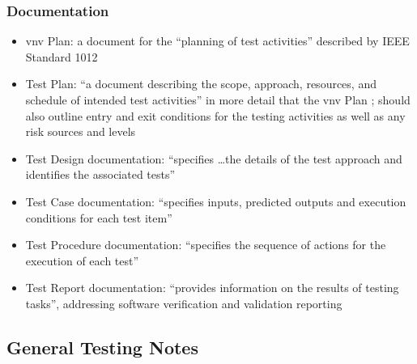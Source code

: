 \subsubsection{Documentation}

\begin{itemize}
      \item \acf{vnv} Plan: a document for the ``planning of test activities''
            described by IEEE Standard 1012 \cite[p.~411]{van_vliet_software_2000}
      \item Test Plan: ``a document describing the scope, approach, resources,
            and schedule of intended test activities'' in more detail that the
            \acs{vnv} Plan \cite[pp.~412-413]{van_vliet_software_2000};
            should also outline entry and exit conditions for the testing
            activities as well as any risk sources and levels
            \cite[p.~445]{peters_software_2000}
      \item Test Design documentation: ``specifies \dots the details of the
            test approach and identifies the associated tests''
            \cite[p.~413]{van_vliet_software_2000}
      \item Test Case documentation: ``specifies inputs, predicted outputs and
            execution conditions for each test item''
            \cite[p.~413]{van_vliet_software_2000}
      \item Test Procedure documentation: ``specifies the sequence of actions
            for the execution of each test'' \cite[p.~413]{van_vliet_software_2000}
      \item Test Report documentation: ``provides information on the results of
            testing tasks'', addressing software verification and validation
            reporting \cite[p.~413]{van_vliet_software_2000}
\end{itemize}

\subsection{General Testing Notes}

